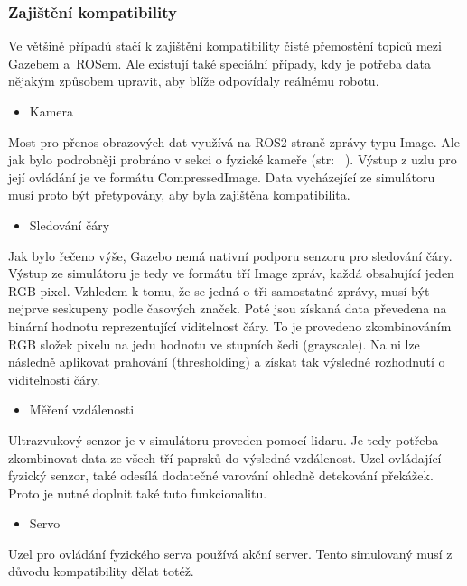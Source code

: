 \newpage
\subsubsection*{Zajištění kompatibility}
Ve většině případů stačí k zajištění kompatibility čisté přemostění topiců mezi Gazebem a~ROSem. Ale existují také speciální případy, kdy je potřeba data nějakým způsobem upravit, aby blíže odpovídaly reálnému robotu. 

\begin{itemize}[leftmargin=*]
	\item{Kamera}
\end{itemize}
\vspace*{-0.5em}
Most pro přenos obrazových dat využívá na ROS2 straně zprávy typu Image. Ale jak bylo podrobněji probráno v sekci o fyzické kameře (str:~ \pageref{implementation:camera}). Výstup z uzlu pro její ovládání je ve formátu CompressedImage. Data vycházející ze simulátoru musí proto být přetypovány, aby byla zajištěna kompatibilita.

\begin{itemize}[leftmargin=*]
	\item{Sledování čáry}
\end{itemize}
\vspace*{-0.5em}
Jak bylo řečeno výše, Gazebo nemá nativní podporu senzoru pro sledování čáry. Výstup ze simulátoru je tedy ve formátu tří Image zpráv, každá obsahující jeden RGB pixel. Vzhledem k tomu, že se jedná o tři samostatné zprávy, musí být nejprve seskupeny podle časových značek. Poté jsou získaná data převedena na binární hodnotu reprezentující viditelnost čáry. To je provedeno zkombinováním RGB složek pixelu na jedu hodnotu ve stupních šedi (grayscale). Na ni lze následně aplikovat prahování (thresholding) a získat tak výsledné rozhodnutí o viditelnosti čáry.

\begin{itemize}[leftmargin=*]
	\item{Měření vzdálenosti}
\end{itemize}
\vspace*{-0.5em}
Ultrazvukový senzor je v simulátoru proveden pomocí lidaru. Je tedy potřeba zkombinovat data ze všech tří paprsků do výsledné vzdálenost. Uzel ovládající fyzický senzor, také odesílá dodatečné varování ohledně detekování překážek. Proto je nutné doplnit také tuto funkcionalitu.

\begin{itemize}[leftmargin=*]
	\item{Servo}
\end{itemize}
\vspace*{-0.5em}
Uzel pro ovládání fyzického serva používá akční server. Tento simulovaný musí z důvodu kompatibility dělat totéž.

